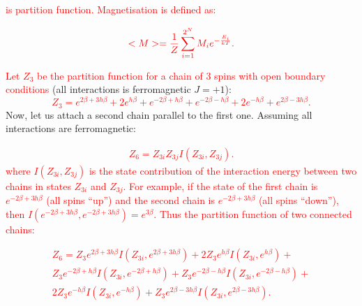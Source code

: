 \documentclass[preprint,12pt]{elsarticle}
\begin{document}
	\noindent \textcolor{red}{is partition function. Magnetisation is defined as:} 
	
	\begin{equation}
		\color{red}
		<M> = \frac{1}{Z} \sum_{i = 1}^{2^N} M_i e^{-\frac{E_i}{kT}}.
		\label{magnetisation}
	\end{equation}
	
	\textcolor{red}{Let $Z_3$ be the partition function for a chain of 3 spins with open boundary conditions} (all interactions is ferromagnetic $J = +1$):
	\textcolor{red}{
		\begin{equation}
		Z_3 = e^{2\beta + 3h\beta} + 2e^{h\beta} + e^{- 2\beta + h\beta } + e^{- 2\beta -h\beta}  + 2e^{-h\beta} + e^{2\beta - 3h\beta}.
		\label{eq:stat_3}
	\end{equation}
}
	Now, let us attach a second chain parallel to the first one. Assuming all interactions are ferromagnetic:
	
	\textcolor{red}{
	\begin{equation}
		\label{eq:stat_z3}
		\begin{alignedat}{2}
			Z_6 =  Z_{3i}Z_{3j}I(Z_{3i},Z_{3j}).
		\end{alignedat}
	\end{equation}
}
	\noindent \textcolor{red}{where $I(Z_{3i},Z_{3j})$ is the state contribution of the interaction energy between two chains in states $Z_{3i}$ and $Z_{3j}$. For example, if the state of the first chain is $e^{-2\beta+3h\beta}$ (all spins ``up'') and the second chain is $e^{-2\beta+3h\beta}$ (all spins ``down''), then $I(e^{-2\beta+3h\beta}, e^{-2\beta+3h\beta})=e^{3\beta}$. Thus the partition function of two connected chains:}
	
	\textcolor{red}{
		\begin{equation}
			\label{eq:stat_6}
			\begin{alignedat}{3}
			Z_6 = Z_{3}e^{2\beta + 3h\beta}I(Z_{3i}, e^{2\beta + 3h\beta}) + 2Z_{3}e^{h\beta}I(Z_{3i}, e^{h\beta}) + \\
			Z_{3}e^{- 2\beta + h\beta }I(Z_{3i}, e^{- 2\beta + h\beta }) + Z_{3}e^{- 2\beta -h\beta}I(Z_{3i}, e^{- 2\beta -h\beta})  + \\
			2Z_{3}e^{-h\beta}I(Z_{3i}, e^{-h\beta}) + Z_{3}e^{2\beta - 3h\beta}I(Z_{3i}, e^{2\beta - 3h\beta}).
			\end{alignedat}
		\end{equation}
	}
	
\end{document}
